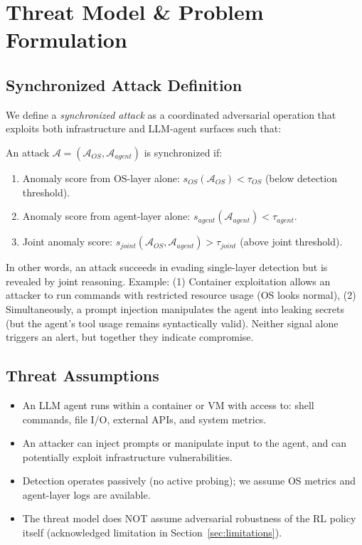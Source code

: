 \documentclass[conference]{IEEEtran}
\begin{document}
\section{Threat Model \& Problem Formulation}\label{sec:threat}

\subsection{Synchronized Attack Definition}

We define a \emph{synchronized attack} as a coordinated adversarial operation that exploits both infrastructure and LLM-agent surfaces such that:

\begin{definition}
An attack $\mathcal{A} = (\mathcal{A}_{OS}, \mathcal{A}_{agent})$ is synchronized if:
\begin{enumerate}
\item Anomaly score from OS-layer alone: $s_{OS}(\mathcal{A}_{OS}) < \tau_{OS}$ (below detection threshold).
\item Anomaly score from agent-layer alone: $s_{agent}(\mathcal{A}_{agent}) < \tau_{agent}$.
\item Joint anomaly score: $s_{joint}(\mathcal{A}_{OS}, \mathcal{A}_{agent}) > \tau_{joint}$ (above joint threshold).
\end{enumerate}
\end{definition}

In other words, an attack succeeds in evading single-layer detection but is revealed by joint reasoning. Example: (1) Container exploitation allows an attacker to run commands with restricted resource usage (OS looks normal), (2) Simultaneously, a prompt injection manipulates the agent into leaking secrets (but the agent's tool usage remains syntactically valid). Neither signal alone triggers an alert, but together they indicate compromise.

\subsection{Threat Assumptions}

\begin{itemize}
\item An LLM agent runs within a container or VM with access to: shell commands, file I/O, external APIs, and system metrics.
\item An attacker can inject prompts or manipulate input to the agent, and can potentially exploit infrastructure vulnerabilities.
\item Detection operates passively (no active probing); we assume OS metrics and agent-layer logs are available.
\item The threat model does NOT assume adversarial robustness of the RL policy itself (acknowledged limitation in Section~\ref{sec:limitations}).
\end{itemize}
\end{document}
